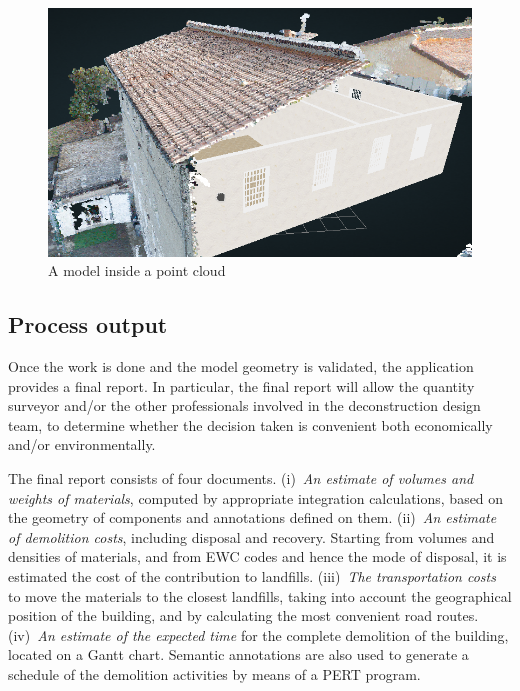 \documentclass[a4paper,twoside]{article}
\begin{document}
\begin{figure}[htbp] %
   \centering
   \includegraphics[width=1\linewidth]{images/augmented}
   \caption{A model inside a point cloud}
   \label{fig:augmented}
\end{figure}

\subsection{Process output}

\noindent 
Once the work is done and the model geometry is validated, the application provides a final report.
In particular, the final report will allow the quantity surveyor and/or the other professionals involved in the deconstruction design team, to determine whether the decision taken is convenient both economically and/or environmentally.

The final report consists of four documents.
(i)~\emph{An estimate of volumes and weights of materials}, computed by appropriate integration calculations, based on the geometry of components and annotations defined on them.
(ii)~\emph{An estimate of demolition costs}, including disposal and recovery.
Starting from volumes and densities of materials, and from EWC codes and hence the mode of disposal, it is estimated the cost of the contribution to landfills.
(iii)~\emph{The transportation costs} to move the materials to the closest landfills, taking into account the geographical position of the building, and by calculating the most convenient road routes.
(iv)~\emph{An estimate of the expected time} for the complete demolition of the building, located on a Gantt chart. Semantic annotations are also used to generate a schedule of the demolition activities by means of a PERT program.
\end{document}
